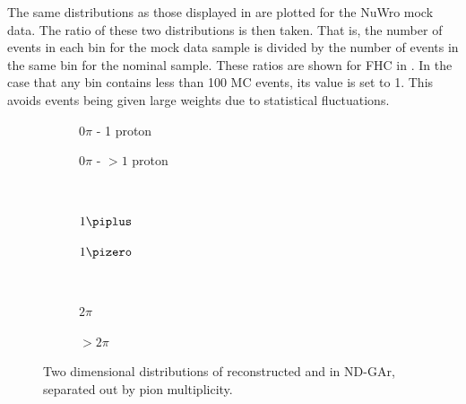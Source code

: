 The same distributions as those displayed in  are plotted for the NuWro mock data.
The ratio of these two distributions is then taken.
That is, the number of events in each bin for the mock data sample is divided by the number of events in the same bin for the nominal sample.
These ratios are shown for FHC in .
In the case that any bin contains less than \num{100} MC events, its value is set to 1.
This avoids events being given large weights due to statistical fluctuations.

\begin{figure}[t]
	\begin{subfigure}[t]{.5\linewidth}
		\begin{adjustbox}{max totalsize=\linewidth, center}
			
		\end{adjustbox}
		\caption{$0\pi$ - 1 proton}
	\end{subfigure}
	\hfill
	\begin{subfigure}[t]{.5\linewidth}
		\begin{adjustbox}{max totalsize=\linewidth, center}
			
		\end{adjustbox}
		\caption{$0\pi$ - $>1$ proton}
	\end{subfigure} \\
	\begin{subfigure}[t]{.5\linewidth}
		\begin{adjustbox}{max totalsize=\linewidth, center}
			
		\end{adjustbox}
		\caption{$1\piplus$}
	\end{subfigure}
	\hfill
	\begin{subfigure}[t]{.5\linewidth}
		\begin{adjustbox}{max totalsize=\linewidth, center}
			
		\end{adjustbox}
		\caption{$1\pizero$}
	\end{subfigure} \\
	\begin{subfigure}[t]{.5\linewidth}
		\begin{adjustbox}{max totalsize=\linewidth, center}
			
		\end{adjustbox}
		\caption{$2\pi$}
	\end{subfigure}
	\hfill
	\begin{subfigure}[t]{.5\linewidth}
		\begin{adjustbox}{max totalsize=\linewidth, center}
			
		\end{adjustbox}
		\caption{$>2\pi$}
	\end{subfigure}
	\caption[Ratio of NuWro to GENIE of two-dimensional distributions of \evis and \pvis in ND-GAr]{Two dimensional distributions of reconstructed \evis and \pvis in ND-GAr, separated out by pion multiplicity.}
	\label{fig:q0q3RatioFhc}
\end{figure}

